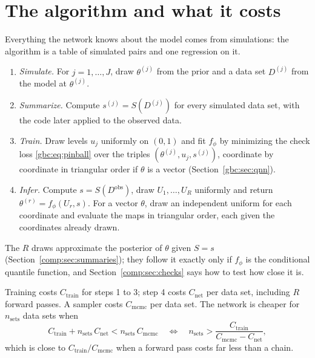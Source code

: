 \section{The algorithm and what it costs}\label{comp:sec:algorithm}\label{gbc:sec:algorithm}

Everything the network knows about the model comes from simulations: the algorithm is a table of simulated pairs and one regression on it.

\begin{enumerate}[leftmargin=*]
\item \emph{Simulate.} For $j=1,\dots,J$, draw $\theta^{(j)}$ from the prior and a data set $D^{(j)}$ from the model at $\theta^{(j)}$.
\item \emph{Summarize.} Compute $s^{(j)}=S(D^{(j)})$ for every simulated data set, with the code later applied to the observed data.
\item \emph{Train.} Draw levels $u_j$ uniformly on $(0,1)$ and fit $f_\phi$ by minimizing the check loss \eqref{gbc:eq:pinball} over the triples $(\theta^{(j)},u_j,s^{(j)})$, coordinate by coordinate in triangular order if $\theta$ is a vector (Section~\ref{gbc:sec:qnn}).
\item \emph{Infer.} Compute $s=S(D^{\mathrm{obs}})$, draw $U_1,\dots,U_R$ uniformly and return $\theta^{(r)}=f_\phi(U_r,s)$. For a vector $\theta$, draw an independent uniform for each coordinate and evaluate the maps in triangular order, each given the coordinates already drawn.
\end{enumerate}

The $R$ draws approximate the posterior of $\theta$ given $S=s$ (Section~\ref{comp:sec:summaries}); they follow it exactly only if $f_\phi$ is the conditional quantile function, and Section~\ref{comp:sec:checks} says how to test how close it is. 

Training costs $C_{\mathrm{train}}$ for steps 1 to 3; step 4 costs $C_{\mathrm{net}}$ per data set, including $R$ forward passes. A sampler costs $C_{\mathrm{mcmc}}$ per data set. The network is cheaper for $n_{\mathrm{sets}}$ data sets when
\[
C_{\mathrm{train}} + n_{\mathrm{sets}}\,C_{\mathrm{net}} < n_{\mathrm{sets}}\,C_{\mathrm{mcmc}}
\quad\Longleftrightarrow\quad
n_{\mathrm{sets}} > \frac{C_{\mathrm{train}}}{C_{\mathrm{mcmc}} - C_{\mathrm{net}}},
\]
which is close to $C_{\mathrm{train}}/C_{\mathrm{mcmc}}$ when a forward pass costs far less than a chain.

